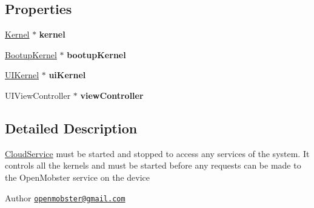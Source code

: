 \subsection*{\-Properties}
\begin{DoxyCompactItemize}
\item 
\hypertarget{interface_cloud_service_a7f7e9e2447b17386b0feaeffefa7feb1}{
\hyperlink{interface_kernel}{\-Kernel} $\ast$ {\bfseries kernel}}
\label{interface_cloud_service_a7f7e9e2447b17386b0feaeffefa7feb1}

\item 
\hypertarget{interface_cloud_service_a5536a0a403267123daf2f067c4bf1a0c}{
\hyperlink{interface_bootup_kernel}{\-Bootup\-Kernel} $\ast$ {\bfseries bootup\-Kernel}}
\label{interface_cloud_service_a5536a0a403267123daf2f067c4bf1a0c}

\item 
\hypertarget{interface_cloud_service_ae5dd6329209934db41aedacffb209663}{
\hyperlink{interface_u_i_kernel}{\-U\-I\-Kernel} $\ast$ {\bfseries ui\-Kernel}}
\label{interface_cloud_service_ae5dd6329209934db41aedacffb209663}

\item 
\hypertarget{interface_cloud_service_a374ed14b535dcf87b427fd147b69df7f}{
\-U\-I\-View\-Controller $\ast$ {\bfseries view\-Controller}}
\label{interface_cloud_service_a374ed14b535dcf87b427fd147b69df7f}

\end{DoxyCompactItemize}


\subsection{\-Detailed \-Description}
\hyperlink{interface_cloud_service}{\-Cloud\-Service} must be started and stopped to access any services of the system. \-It controls all the kernels and must be started before any requests can be made to the \-Open\-Mobster service on the device

\begin{DoxyAuthor}{\-Author}
\href{mailto:openmobster@gmail.com}{\tt openmobster@gmail.\-com} 
\end{DoxyAuthor}


